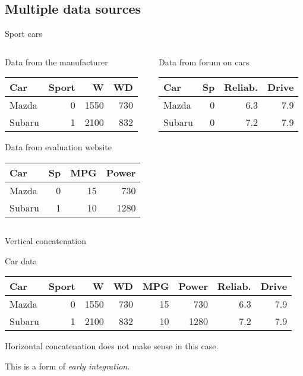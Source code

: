\documentclass[hyperref={colorlinks=true}]{beamer}
\begin{document}
\subsection{Multiple data sources}
\begin{frame}{Sport cars}
  \begin{columns}[c]
  \begin{column}{.5\textwidth}
    \begin{block}{Data from the manufacturer}
      \begin{tabular}{l|r|rr}
      Car & Sport & W & WD \\
      \hline
      Mazda  & 0 & 1550 & 730 \\
      Subaru & 1 & 2100 & 832 \\
      \hline
      \end{tabular}
    \end{block}
    \begin{block}{Data from evaluation website}
      \begin{tabular}{l|r|rr}
      Car & Sp & MPG & Power \\
      \hline
      Mazda  & 0 & 15 &  730 \\
      Subaru & 1 & 10 & 1280 \\
      \hline
      \end{tabular}
    \end{block}
  \end{column}
  \begin{column}{.5\textwidth}
    \begin{block}{Data from forum on cars}
      \begin{tabular}{l|r|rr}
      Car & Sp & Reliab. & Drive \\
      \hline
      Mazda  & 0 & 6.3 & 7.9 \\
      Subaru & 0 & 7.2 & 7.9 \\
      \hline
      \end{tabular}
    \end{block}
  \end{column}
  \end{columns}
\end{frame}

\begin{frame}{Vertical concatenation}
  \begin{block}{Car data}
    \begin{tabular}{l|r|rrrrrr}
    Car & Sport & W & WD & MPG & Power & Reliab. & Drive \\
    \hline
    Mazda  & 0 & 1550 & 730 & 15 &  730 & 6.3 & 7.9 \\
    Subaru & 1 & 2100 & 832 & 10 & 1280 & 7.2 & 7.9 \\
    \hline
    \end{tabular}
  \end{block}
  \pause
  Horizontal concatenation does not make sense in this case.

  This is a form of \emph{early integration}.

\end{frame}
\end{document}
